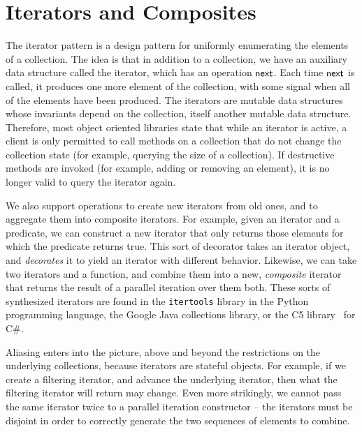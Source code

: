 
\section{Iterators and Composites}

The iterator pattern is a design pattern for uniformly enumerating the
elements of a collection. The idea is that in addition to a
collection, we have an auxiliary data structure called the iterator,
which has an operation $\mathsf{next}$. Each time $\mathsf{next}$ is
called, it produces one more element of the collection, with some
signal when all of the elements have been produced. The iterators are
mutable data structures whose invariants depend on the collection,
itself another mutable data structure. Therefore, most object oriented
libraries state that while an iterator is active, a client is only
permitted to call methods on a collection that do not change the
collection state (for example, querying the size of a collection). If
destructive methods are invoked (for example, adding or removing an
element), it is no longer valid to query the iterator again.

We also support operations to create new iterators from old ones, and
to aggregate them into composite iterators. For example, given an
iterator and a predicate, we can construct a new iterator that only
returns those elements for which the predicate returns true. This sort
of decorator takes an iterator object, and \emph{decorates} it to
yield an iterator with different behavior. Likewise, we can take two
iterators and a function, and combine them into a new,
\emph{composite} iterator that returns the result of a parallel
iteration over them both.  These sorts of synthesized iterators are found
in the \texttt{itertools} library in the Python programming language,
the Google Java collections library, or the C5 library~\cite{C5} for
C\#.

Aliasing enters into the picture, above and beyond the restrictions on
the underlying collections, because iterators are stateful
objects. For example, if we create a filtering iterator, and advance
the underlying iterator, then what the filtering iterator will return
may change. Even more strikingly, we cannot pass the same iterator
twice to a parallel iteration constructor -- the iterators must be
disjoint in order to correctly generate the two sequences of elements
to combine.

